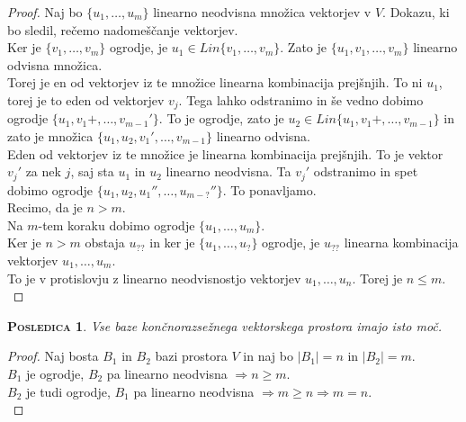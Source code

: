 \documentclass[a4paper,12pt]{article}
\newtheorem*{posledica}{\textsc{Posledica}}
\begin{document}
\begin{proof}
Naj bo $\{u_1,\ldots,u_m\}$ linearno neodvisna množica vektorjev v $V$. Dokazu, ki bo \linebreak sledil, rečemo nadomeščanje vektorjev. \\

Ker je $\{v_1,\ldots,v_m\}$ ogrodje, je $u_1\in Lin\{v_1,\ldots,v_m\}$. Zato je $\{u_1,v_1,\ldots,v_m\}$ linearno \linebreak  odvisna množica. \\

Torej je en od vektorjev iz te množice linearna kombinacija prejšnjih. To ni $u_1$, torej je to eden od vektorjev $v_j$. Tega lahko odstranimo in še vedno dobimo ogrodje $\{u_1,v_1+,\ldots,v_{m-1}'\}$. To je ogrodje, zato je $u_2\in Lin\{u_1,v_1+,\ldots,v_{m-1}\}$ in zato je množica $\{u_1,u_2,v_1',\ldots,v_{m-1}\}$ linearno odvisna. \\

Eden od vektorjev iz te množice je linearna kombinacija prejšnjih. To je vektor $v_j'$ za nek $j$, saj sta $u_1$ in $u_2$ linearno neodvisna. Ta $v_j'$ odstranimo in spet dobimo ogrodje $\{u_1,u_2,u_1'',\ldots,u_{m-?}''\}$. To ponavljamo. \\

Recimo, da je $n > m$. \\

Na $m$-tem koraku dobimo ogrodje $\{u_1,\ldots,u_m\}$. \\

Ker je $n>m$ obstaja $u_{??}$ in ker je $\{u_1,\ldots,u_?\}$ ogrodje, je $u_{??}$ linearna kombinacija vektorjev $u_1,\ldots,u_m$. \\

To je v protislovju z linearno neodvisnostjo vektorjev $u_1,\ldots,u_n$. Torej je $n \leq m$. \\
\end{proof}

\begin{posledica}
Vse baze končnorazsežnega vektorskega prostora imajo isto moč. \\
\end{posledica}

\begin{proof}
Naj bosta $B_1$ in $B_2$ bazi prostora $V$ in naj bo $|B_1|=n$ in $|B_2|=m$. \\

$B_1$ je ogrodje, $B_2$ pa linearno neodvisna $\Rightarrow n \geq m$. \\

$B_2$ je tudi ogrodje, $B_1$ pa linearno neodvisna $\Rightarrow m \geq n \Rightarrow m=n$.\\
\end{proof}
\end{document}
